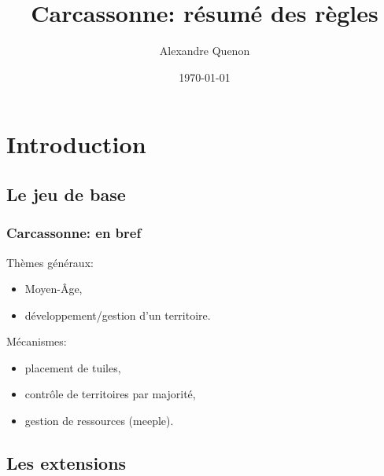 \documentclass[11pt]{beamer}
\title{Carcassonne: résumé des règles}
\author[A. Quenon]{Alexandre Quenon}
\date{\today}
\begin{document}
\frame{\titlepage}


\begin{frame}
	\tableofcontents
\end{frame}

\AtBeginSection{%
	\begin{frame}
		\tableofcontents[currentsection]
	\end{frame}
}


\section{Introduction}

	\subsection{Le jeu de base}

\begin{frame}
	\frametitle{Carcassonne: en bref}
	
	Thèmes généraux:
	\begin{itemize}
		\item Moyen-Âge,
		\item développement/gestion d'un territoire.
	\end{itemize}

	\vspace*{1ex}
	
	Mécanismes:
	\begin{itemize}
		\item placement de tuiles,
		\item contrôle de territoires par majorité,
		\item gestion de ressources (meeple).
	\end{itemize}
\end{frame}


	\subsection{Les extensions}
\end{document}
